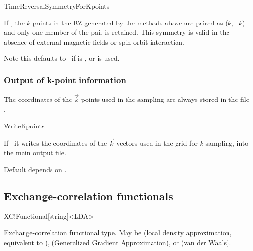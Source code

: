 \begin{fdflogicalT}{TimeReversalSymmetryForKpoints}

  If \fdftrue, the $k$-points in the BZ generated by the methods above
  are paired as ($k$,$-k$) and only one member of the pair is
  retained. This symmetry is valid in the absence of external magnetic
  fields or spin-orbit interaction.

  Note this defaults to \fdffalse\ if  is
  ,  or  is used.

\end{fdflogicalT}


\subsubsection{Output of k-point information}

The coordinates of the $\vec k$ points used in the sampling
are always stored in the file .

\begin{fdflogicalF}{WriteKpoints}
  
  If \fdftrue\ it writes the coordinates of the $\vec k$ vectors used
  in the grid for $k$-sampling, into the main output file.
  
  Default depends on .

\end{fdflogicalF}



\subsection{Exchange-correlation functionals}


\begin{fdfentry}{XC!Functional}[string]<LDA>
  
  Exchange-correlation functional type. May be  (local
  density approximation, equivalent to ), 
  (Generalized Gradient Approximation), or  (van der
  Waals).

\end{fdfentry}

